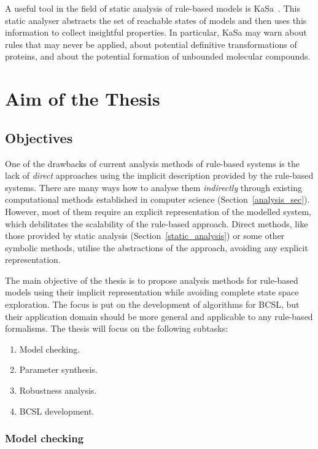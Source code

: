 \documentclass[11pt,a4paper]{report}
\begin{document}
A useful tool in the field of static analysis of rule-based models is KaSa~\cite{boutillier2018kasa}. This static analyser abstracts the set of reachable states of models and then uses this information to collect insightful properties. In particular, KaSa may warn about rules that may never be applied, about potential definitive transformations of proteins, and about the potential formation of unbounded molecular compounds.

\chapter{Aim of the Thesis} \label{chap:aim}

\section{Objectives}

One of the drawbacks of current analysis methods of rule-based systems is the lack of \emph{direct} approaches using the implicit description provided by the rule-based systems. There are many ways how to analyse them \emph{indirectly} through existing computational methods established in computer science (Section~\ref{analysis_sec}). However, most of them require an explicit representation of the modelled system, which debilitates the scalability of the rule-based approach. Direct methods, like those provided by static analysis (Section~\ref{static_analysis}) or some other symbolic methods, utilise the abstractions of the approach, avoiding any explicit representation. 

The main objective of the thesis is to propose analysis methods for rule-based models using their implicit representation while avoiding complete state space exploration. The focus is put on the development of algorithms for BCSL, but their application domain should be more general and applicable to any rule-based formalisms. The thesis will focus on the following subtasks:

\begin{enumerate}
	\setlength\itemsep{0.001cm}
	\item Model checking.
	\item Parameter synthesis.
	\item Robustness analysis.
	\item BCSL development.
\end{enumerate}

\subsection{Model checking}
\end{document}
